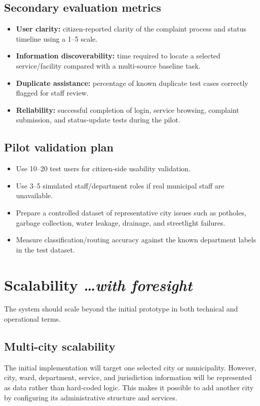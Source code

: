 \documentclass[11pt,a4paper]{article}
\newcommand{\BvrHint}[1]{{\normalfont\normalsize\itshape\hfill #1}}
\begin{document}
\subsection{Secondary evaluation metrics}
\begin{itemize}[leftmargin=0.7cm]
    \item \textbf{User clarity:} citizen-reported clarity of the complaint process and status timeline using a 1--5 scale.
    \item \textbf{Information discoverability:} time required to locate a selected service/facility compared with a multi-source baseline task.
    \item \textbf{Duplicate assistance:} percentage of known duplicate test cases correctly flagged for staff review.
    \item \textbf{Reliability:} successful completion of login, service browsing, complaint submission, and status-update tests during the pilot.
\end{itemize}

\subsection{Pilot validation plan}
\begin{itemize}[leftmargin=0.7cm]
    \item Use 10--20 test users for citizen-side usability validation.
    \item Use 3--5 simulated staff/department roles if real municipal staff are unavailable.
    \item Prepare a controlled dataset of representative city issues such as potholes, garbage collection, water leakage, drainage, and streetlight failures.
    \item Measure classification/routing accuracy against the known department labels in the test dataset.
\end{itemize}

\section{Scalability %
\BvrHint{\ldots with foresight}}
The system should scale beyond the initial prototype in both technical and operational terms.

\subsection{Multi-city scalability}
The initial implementation will target one selected city or municipality. However, city, ward, department, service, and jurisdiction information will be represented as data rather than hard-coded logic. This makes it possible to add another city by configuring its administrative structure and services.
\end{document}
